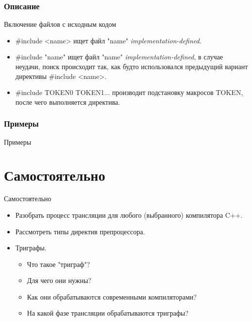     \subsubsection{Описание}
    \begin{frame}{Включение файлов с исходным кодом}
        \begin{itemize}
            \item \#include <name> ищет файл "name" \textit{implementation-defined}.
            \item \#include "name" ищет файл "name" \textit{implementation-defined}, в случае неудачи,
                поиск происходит так, как будто использовался предыдущий вариант директивы \#include <name>.
            \item \#include TOKEN0 TOKEN1... производит подстановку макросов TOKEN, после чего выполняется директива.
        \end{itemize}
    \end{frame}
    \subsubsection{Примеры}
    \begin{frame}{Примеры}
        
    \end{frame}
    \section{Самостоятельно}
    \begin{frame}{Самостоятельно}
        \begin{itemize}
            \item Разобрать процесс трансляции для любого (выбранного) компилятора C++.
            \item Рассмотреть типы директив препроцессора.
            \item Триграфы.
                \begin{itemize}
                    \item Что такое "триграф"?
                    \item Для чего они нужны?
                    \item Как они обрабатываются современными компиляторами?
                    \item На какой фазе трансляции обрабатываются триграфы?
                \end{itemize}
        \end{itemize}
    \end{frame}

